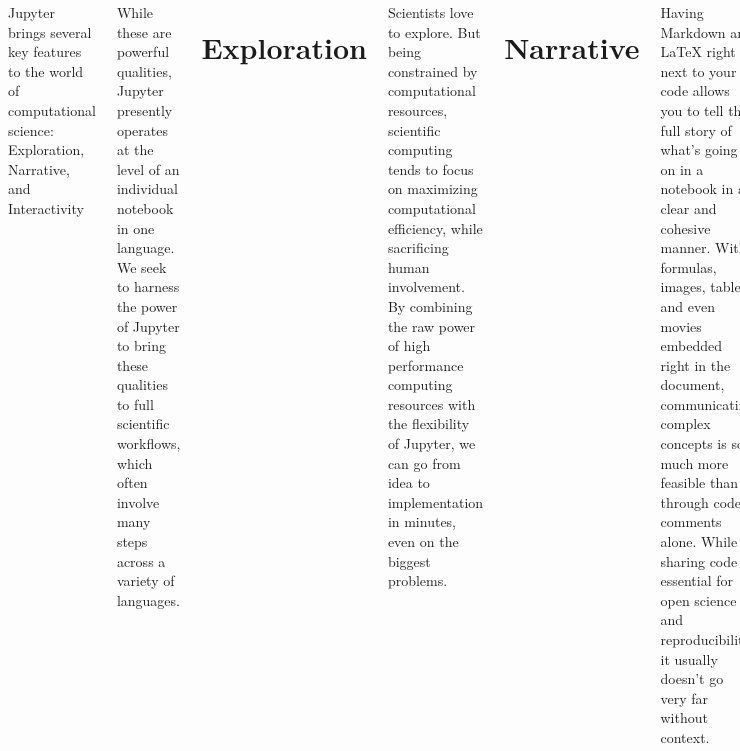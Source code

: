 \documentclass{tikzposter}
\begin{document}
\begin{columns}
 {

Jupyter brings several key features to the world of computational
science: Exploration, Narrative, and Interactivity

While these are powerful qualities, Jupyter presently operates at the
level of an individual notebook in one language. We seek to harness the
power of Jupyter to bring these qualities to full scientific workflows,
which often involve many steps across a variety of languages.

\section*{Exploration}\label{exploration}

Scientists love to explore. But being constrained by computational
resources, scientific computing tends to focus on maximizing
computational efficiency, while sacrificing human involvement. By
combining the raw power of high performance computing resources with the
flexibility of Jupyter, we can go from idea to implementation in
minutes, even on the biggest problems.

\section*{Narrative}\label{narrative}

Having Markdown and LaTeX right next to your code allows you to tell the
full story of what's going on in a notebook in a clear and cohesive
manner. With formulas, images, tables, and even movies embedded right in
the document, communicating complex concepts is so much more feasible
than through code comments alone. While sharing code is essential for
open science and reproducibility, it usually doesn't go very far without
context.

By bringing the power of narrative from the individual notebook to full
workflows, we hope to make HPC workflows as easy to share effectively as
small individual notebooks.

\section*{Interactivity}\label{interactivity}

Being able to touch your data and models provides a deeper ability to
understand them. The Jupyter widget ecosystem provides a wide range of
interactive elements that allow for the visualization and exploration of
high dimensional spaces. In HPC systems, interactivity has generally
been at the bottom of the food chain. We hope to bridge that gap by
providing an easy means by which to examine simulations and analysis
codes as they run, and to be able to have interactive pieces of a
scientific workflow, where you know that you're going to need human
interaction in between computational tasks.

}
\end{columns}
\end{document}
